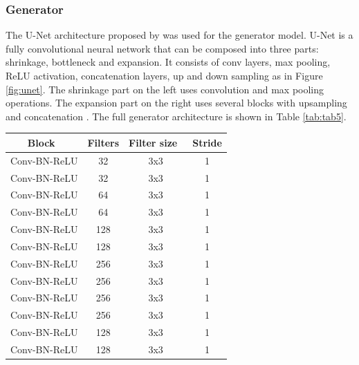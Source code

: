 \subsubsection*{Generator}
The U-Net architecture proposed by \cite{ronneberger2015u} was used for the generator model. U-Net is a fully convolutional neural network that can be composed into three parts: shrinkage, bottleneck and expansion. It consists of conv layers, max pooling, ReLU activation, concatenation layers, up and down sampling as in Figure \ref{fig:unet}. The shrinkage part on the left uses convolution and max pooling operations. The expansion part on the right uses several blocks with upsampling and concatenation \citep{ronneberger2015u}. The full generator architecture is shown in Table \ref{tab:tab5}.
\begin{table}[H]
\centering
\begin{tabular}{|c|c|c|c|} 
\hline
\textbf{Block~} & \textbf{Filters} & \textbf{Filter size~} & \textbf{Stride}  \\ 
\hline
Conv-BN-ReLU    & 32               & 3x3                   & 1                \\ 
\hline
Conv-BN-ReLU    & 32               & 3x3                   & 1                \\ 
\hline
Conv-BN-ReLU    & 64               & 3x3                   & 1                \\ 
\hline
Conv-BN-ReLU    & 64               & 3x3                   & 1                \\ 
\hline
Conv-BN-ReLU    & 128              & 3x3                   & 1                \\ 
\hline
Conv-BN-ReLU    & 128              & 3x3                   & 1                \\ 
\hline
Conv-BN-ReLU    & 256              & 3x3                   & 1                \\ 
\hline
Conv-BN-ReLU    & 256              & 3x3                   & 1                \\ 
\hline
Conv-BN-ReLU    & 256              & 3x3                   & 1                \\ 
\hline
Conv-BN-ReLU    & 256              & 3x3                   & 1                \\ 
\hline
Conv-BN-ReLU    & 128              & 3x3                   & 1                \\ 
\hline
Conv-BN-ReLU    & 128              & 3x3                   & 1                \\ 
\hline

\end{tabular}
\end{table}
